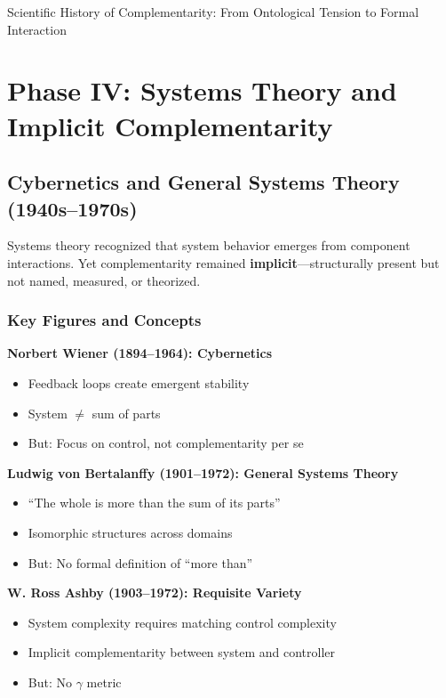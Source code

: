\begin{chapter}{Scientific History of Complementarity: From Ontological Tension to Formal Interaction}
\section{Phase IV: Systems Theory and Implicit Complementarity}
\label{sec:phase-iv}

\subsection{Cybernetics and General Systems Theory (1940s--1970s)}

\begin{tcolorbox}[colback=blue!5!white,colframe=blue!75!black,title=\textbf{Structural Presence, Conceptual Absence}]
Systems theory recognized that system behavior emerges from component interactions. Yet complementarity remained \textbf{implicit}---structurally present but not named, measured, or theorized.
\end{tcolorbox}

\subsubsection{Key Figures and Concepts}

\textbf{Norbert Wiener (1894--1964): Cybernetics}
\begin{itemize}[noitemsep]
    \item Feedback loops create emergent stability
    \item System $\neq$ sum of parts
    \item But: Focus on control, not complementarity per se
\end{itemize}

\textbf{Ludwig von Bertalanffy (1901--1972): General Systems Theory}
\begin{itemize}[noitemsep]
    \item ``The whole is more than the sum of its parts''
    \item Isomorphic structures across domains
    \item But: No formal definition of ``more than''
\end{itemize}

\textbf{W. Ross Ashby (1903--1972): Requisite Variety}
\begin{itemize}[noitemsep]
    \item System complexity requires matching control complexity
    \item Implicit complementarity between system and controller
    \item But: No $\gamma$ metric
\end{itemize}


\end{chapter}
